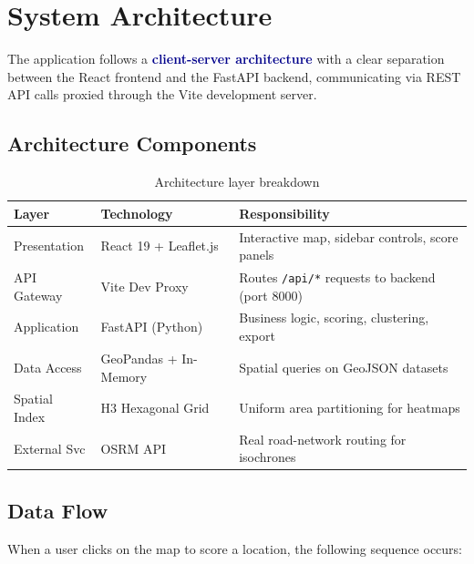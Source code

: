 \documentclass[12pt, a4paper]{article}
\newcommand{\concept}[1]{\textbf{\textcolor{darkblue}{#1}}}
\begin{document}
\newpage

\section{System Architecture}

The application follows a \concept{client-server architecture} with a clear separation
between the React frontend and the FastAPI backend, communicating via REST API calls
proxied through the Vite development server.

\subsection{Architecture Components}

\begin{table}[H]
\centering
\begin{tabularx}{\textwidth}{l l X}
    \toprule
    \textbf{Layer} & \textbf{Technology} & \textbf{Responsibility} \\
    \midrule
    Presentation    & React 19 + Leaflet.js   & Interactive map, sidebar controls, score panels \\
    API Gateway     & Vite Dev Proxy          & Routes \texttt{/api/*} requests to backend (port 8000) \\
    Application     & FastAPI (Python)        & Business logic, scoring, clustering, export \\
    Data Access     & GeoPandas + In-Memory   & Spatial queries on GeoJSON datasets \\
    Spatial Index   & H3 Hexagonal Grid       & Uniform area partitioning for heatmaps \\
    External Svc    & OSRM API                & Real road-network routing for isochrones \\
    \bottomrule
\end{tabularx}
\caption{Architecture layer breakdown}
\end{table}

\subsection{Data Flow}

When a user clicks on the map to score a location, the following sequence occurs:
\end{document}
